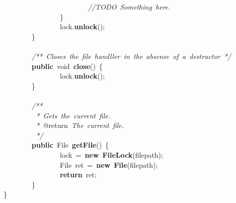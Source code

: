 \mbox{}\ \ \ \ \ \ \ \ \ \ \ \ \ \ \ \ \ \ \ \ \ \ \ \ \textit{//TODO\ Something\ here.} \\
\mbox{}\ \ \ \ \ \ \ \ \ \ \ \ \ \ \ \ \} \\
\mbox{}\ \ \ \ \ \ \ \ \ \ \ \ \ \ \ \ lock.\textbf{unlock}(); \\
\mbox{}\ \ \ \ \ \ \ \ \} \\
\mbox{} \\
\mbox{}\ \ \ \ \ \ \ \ \textit{/**\ Closes\ the\ file\ handller\ in\ the\ absense\ of\ a\ destructor\ */} \\
\mbox{}\ \ \ \ \ \ \ \ \textbf{public}\ void\ \textbf{close}()\ \{ \\
\mbox{}\ \ \ \ \ \ \ \ \ \ \ \ \ \ \ \ lock.\textbf{unlock}(); \\
\mbox{}\ \ \ \ \ \ \ \ \} \\
\mbox{} \\
\mbox{}\ \ \ \ \ \ \ \ \textit{/**} \\
\mbox{}\textit{\ \ \ \ \ \ \ \ \ *\ Gets\ the\ current\ file.} \\
\mbox{}\textit{\ \ \ \ \ \ \ \ \ *\ }@return\textit{\ The\ current\ file.} \\
\mbox{}\textit{\ \ \ \ \ \ \ \ \ */} \\
\mbox{}\ \ \ \ \ \ \ \ \textbf{public}\ File\ \textbf{getFile}()\ \{ \\
\mbox{}\ \ \ \ \ \ \ \ \ \ \ \ \ \ \ \ lock\ =\ \textbf{new}\ \textbf{FileLock}(filepath); \\
\mbox{}\ \ \ \ \ \ \ \ \ \ \ \ \ \ \ \ File\ ret\ =\ \textbf{new}\ \textbf{File}(filepath); \\
\mbox{}\ \ \ \ \ \ \ \ \ \ \ \ \ \ \ \ \textbf{return}\ ret; \\
\mbox{}\ \ \ \ \ \ \ \ \} \\
\mbox{}\} \\

\clearpage
\normalsize
\rmfamily

